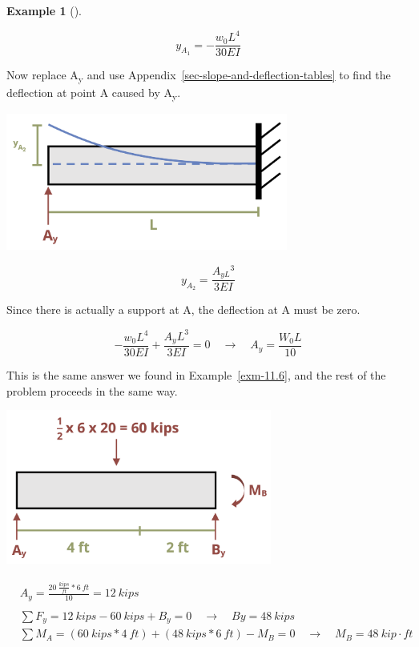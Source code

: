 \documentclass[
  letterpaper,
  DIV=11,
  numbers=noendperiod]{scrreprt}
\theoremstyle{definition}
\newtheorem{example}{Example}[chapter]
\theoremstyle{remark}
\begin{document}
\begin{tcolorbox}
\begin{example}[]
\begin{tcolorbox}
\[
y_{A_1}=-\frac{w_0 L^4}{30 E I}
\]

Now replace A\textsubscript{y} and use
Appendix~\ref{sec-slope-and-deflection-tables} to find the deflection at
point A caused by A\textsubscript{y}.

\begin{center}
\includegraphics[width=3.64583in,height=\textheight]{images/CH11 PNGs/example11.7-3.png}
\end{center}

\[
y_{A_2}=\frac{A_{y L}{ }^3}{3 E I}
\]

Since there is actually a support at A, the deflection at A must be
zero.

\[
-\frac{w_0 L^4}{30 E I}+\frac{A_y L^3}{3EI}=0 \quad \rightarrow \quad A_y=\frac{W_0 L}{10}
\]

This is the same answer we found in Example~\ref{exm-11.6}, and the rest
of the problem proceeds in the same way.

\begin{center}
\includegraphics[width=3.4375in,height=\textheight]{images/clipboard-736394062.png}
\end{center}

\[
\begin{aligned}
&A_y=\frac{20~\frac{kips}{ft}*6{~ft}}{10}=12{~kips} \\
\\
& \sum F_y=12{~kips}-60{~kips}+B_y=0 \quad \rightarrow \quad B y=48{~kips} \\
& \sum M_A=(60{~kips}* 4{~ft})+(48{~kips}*6{~ft})-M_B=0 \quad \rightarrow \quad M_B=48{~kip}\cdot{ft} \\
& \end{aligned}
\]

\end{tcolorbox}

\end{example}

\end{tcolorbox}
\end{document}

